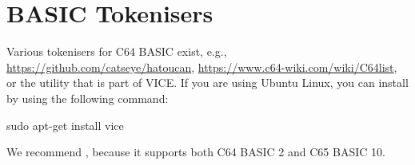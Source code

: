 \chapter{BASIC Tokenisers}

Various tokenisers for C64 BASIC exist, e.g., \url{https://github.com/catseye/hatoucan},
\url{https://www.c64-wiki.com/wiki/C64list}, or the  utility that is part of VICE.
If you are using Ubuntu Linux, you can install  by using the following command:

\begin{screenoutput}
sudo apt-get install vice
\end{screenoutput}

We recommend , because it supports both C64 BASIC 2 and C65 BASIC 10.
